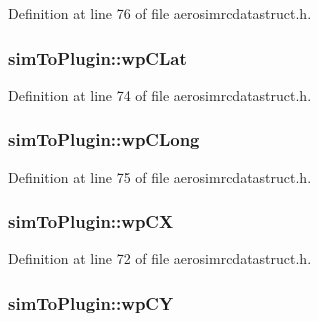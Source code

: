 Definition at line 76 of file aerosimrcdatastruct.\-h.

\hypertarget{group___aero_sim_r_c_ga478358c452d4087d066f487fab4f0fe4}{
\subsubsection[{wp\-C\-Lat}]{ sim\-To\-Plugin\-::wp\-C\-Lat}}\label{group___aero_sim_r_c_ga478358c452d4087d066f487fab4f0fe4}


Definition at line 74 of file aerosimrcdatastruct.\-h.

\hypertarget{group___aero_sim_r_c_gafe8c244799a4b6767955285ea1ab4ed9}{
\subsubsection[{wp\-C\-Long}]{ sim\-To\-Plugin\-::wp\-C\-Long}}\label{group___aero_sim_r_c_gafe8c244799a4b6767955285ea1ab4ed9}


Definition at line 75 of file aerosimrcdatastruct.\-h.

\hypertarget{group___aero_sim_r_c_ga0a8e805aa99027c87923b25db32173ab}{
\subsubsection[{wp\-C\-X}]{ sim\-To\-Plugin\-::wp\-C\-X}}\label{group___aero_sim_r_c_ga0a8e805aa99027c87923b25db32173ab}


Definition at line 72 of file aerosimrcdatastruct.\-h.

\hypertarget{group___aero_sim_r_c_ga3dd39df83926569f9d180ced28377a4f}{
\subsubsection[{wp\-C\-Y}]{ sim\-To\-Plugin\-::wp\-C\-Y}}\label{group___aero_sim_r_c_ga3dd39df83926569f9d180ced28377a4f}


